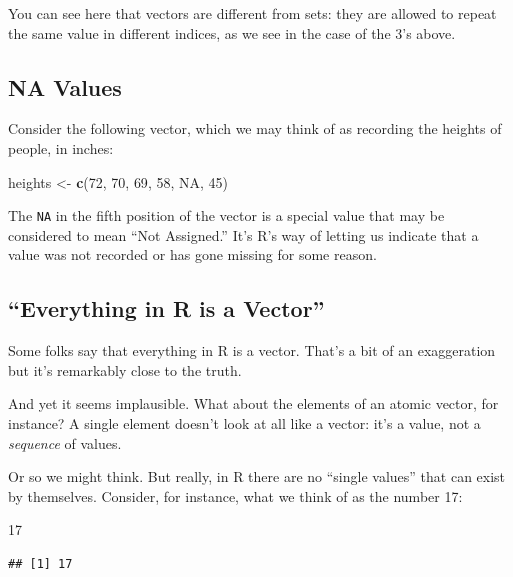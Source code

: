 \documentclass[]{book}
\makeatletter
\newenvironment{Shaded}{\begin{snugshade}}{\end{snugshade}}
\newcommand{\KeywordTok}[1]{\textcolor[rgb]{0.13,0.29,0.53}{\textbf{{#1}}}}
\newcommand{\DecValTok}[1]{\textcolor[rgb]{0.00,0.00,0.81}{{#1}}}
\newcommand{\StringTok}[1]{\textcolor[rgb]{0.31,0.60,0.02}{{#1}}}
\newcommand{\OtherTok}[1]{\textcolor[rgb]{0.56,0.35,0.01}{{#1}}}
\newcommand{\NormalTok}[1]{{#1}}
\newenvironment{kframe}{%
\medskip{}
\setlength{\fboxsep}{.8em}
 \def\at@end@of@kframe{}%
 \ifinner\ifhmode%
  \def\at@end@of@kframe{\end{minipage}}%
  \begin{minipage}{\columnwidth}%
 \fi\fi%
 \def\FrameCommand##1{\hskip\@totalleftmargin \hskip-\fboxsep
 \colorbox{shadecolor}{##1}\hskip-\fboxsep
     \hskip-\linewidth \hskip-\@totalleftmargin \hskip\columnwidth}%
 \MakeFramed {\advance\hsize-\width
   \@totalleftmargin\z@ \linewidth\hsize
   \@setminipage}}%
 {\par\unskip\endMakeFramed%
 \at@end@of@kframe}
\renewenvironment{Shaded}{\begin{kframe}}{\end{kframe}}
\theoremstyle{definition}
\theoremstyle{definition}
\theoremstyle{remark}
\makeatother
\begin{document}
You can see here that vectors are different from sets: they are allowed
to repeat the same value in different indices, as we see in the case of
the 3's above.

\subsection{\texorpdfstring{NA Values
}{NA Values }}\label{na-values}

Consider the following vector, which we may think of as recording the
heights of people, in inches:

\begin{Shaded}
\begin{Highlighting}[]
\NormalTok{heights <-}\StringTok{ }\KeywordTok{c}\NormalTok{(}\DecValTok{72}\NormalTok{, }\DecValTok{70}\NormalTok{, }\DecValTok{69}\NormalTok{, }\DecValTok{58}\NormalTok{, }\OtherTok{NA}\NormalTok{, }\DecValTok{45}\NormalTok{)}
\end{Highlighting}
\end{Shaded}

The \texttt{NA} in the fifth position of the vector is a special value
that may be considered to mean ``Not Assigned.'' It's R's way of letting
us indicate that a value was not recorded or has gone missing for some
reason.

\subsection{\texorpdfstring{``Everything in R is a
Vector''}{Everything in R is a Vector}}\label{everything-in-r-is-a-vector}

Some folks say that everything in R is a vector. That's a bit of an
exaggeration but it's remarkably close to the truth.

And yet it seems implausible. What about the elements of an atomic
vector, for instance? A single element doesn't look at all like a
vector: it's a value, not a \emph{sequence} of values.

Or so we might think. But really, in R there are no ``single values''
that can exist by themselves. Consider, for instance, what we think of
as the number 17:

\begin{Shaded}
\begin{Highlighting}[]
\DecValTok{17}
\end{Highlighting}
\end{Shaded}

\begin{verbatim}
## [1] 17
\end{verbatim}
\end{document}
